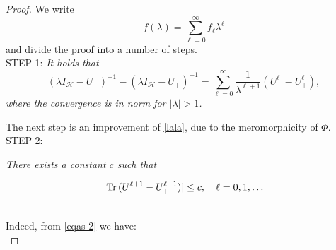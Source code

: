 \documentclass[12pt]{amsart}
\theoremstyle{definition}
\theoremstyle{remark}
\numberwithin{equation}{section}
\begin{document}
      \begin{proof} We write
        \begin{equation}
          f(\lambda)=\sum_{\ell=0}^\infty f_\ell\lambda^\ell
        \end{equation}
        and divide the proof into a number of steps.\\

        STEP 1: {\sl It holds that
\[
  ( \lambda I_{\mathcal H}-U_-)^{-1}-({\lambda}I_{\mathcal H}-U_+)^{-1}=\sum_{\ell=0}^\infty
  \frac{1}{\lambda^{\ell+1}}\left(U_-^\ell-U_+^\ell\right),
\]
where the convergence is in norm for $|\lambda|>1$.\\
}

The next step is an improvement of \eqref{lala}, due to the meromorphicity of $\Phi$.\\

STEP 2: {\sl There exists a constant $c$ such that

\begin{equation}
  | {\rm Tr}\,(U_-^{\ell+1}-U_+^{\ell+1})|\le c ,\quad \ell=0,1,\ldots
  \label{lalala}
\end{equation}
}\\


Indeed, from \eqref{eqas-2} we have:\\


\end{proof}
\end{document}
